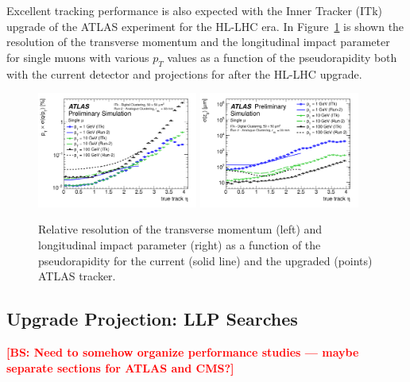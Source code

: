 Excellent tracking performance is also expected with the Inner Tracker (ITk) upgrade of the ATLAS experiment for the HL-LHC era.
In Figure~\ref{fig:atlastrackres} is shown the resolution of the transverse momentum and the longitudinal impact parameter for single muons with various $p_T$ values as a function of the pseudorapidity both with the current
detector and projections for after the HL-LHC upgrade.

\begin{figure}[h!tbp]
\begin{center}
  \includegraphics[width=0.47\textwidth]{figures/ch03_fig_006e.png}
  \includegraphics[width=0.47\textwidth]{figures/ch03_fig_006b.png}
  \caption{Relative resolution of the transverse momentum (left) and longitudinal impact parameter (right) as a function of the pseudorapidity for the current (solid line) and the upgraded (points) ATLAS tracker.}
  \label{fig:atlastrackres}
\end{center}
\end{figure}

\subsection{Upgrade Projection: LLP Searches} \label{sec:upgradesearch}

{\bf \textcolor{red}{[BS: Need to somehow organize performance studies — maybe separate sections for ATLAS and CMS?]}}

